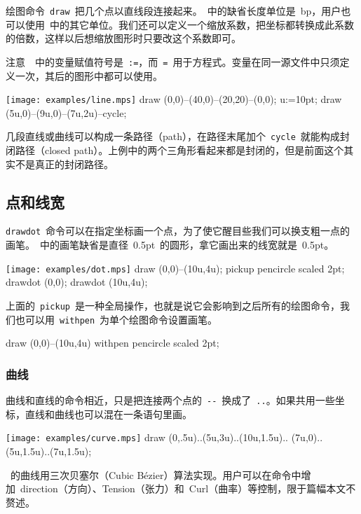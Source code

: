 绘图命令~\verb|draw|~把几个点以直线段连接起来。\MP~中的缺省长度单位是~bp，用户也可以使用~中的其它单位。我们还可以定义一个缩放系数，把坐标都转换成此系数的倍数，这样以后想缩放图形时只要改这个系数即可。

注意~\MP~中的变量赋值符号是~\verb|:=|，而~\verb|=|~用于方程式。变量在同一源文件中只须定义一次，其后的图形中都可以使用。

\begin{fdemo}{\texttt{[image: examples/line.mps]}}
draw (0,0)--(40,0)--(20,20)--(0,0);
u:=10pt; %
draw (5u,0)--(9u,0)--(7u,2u)--cycle;
\end{fdemo}

几段直线或曲线可以构成一条路径（path），在路径末尾加个~\verb|cycle|~就能构成封闭路径（closed path）。上例中的两个三角形看起来都是封闭的，但是前面这个其实不是真正的封闭路径。

\subsection{点和线宽}
\verb|drawdot|~命令可以在指定坐标画一个点，为了使它醒目些我们可以换支粗一点的画笔。\MP~中的画笔缺省是直径~0.5pt~的圆形，拿它画出来的线宽就是~0.5pt。

\begin{fdemo}{\texttt{[image: examples/dot.mps]}}
draw (0,0)--(10u,4u);
pickup pencircle scaled 2pt;
drawdot (0,0);
drawdot (10u,4u);
\end{fdemo}

上面的~\verb|pickup|~是一种全局操作，也就是说它会影响到之后所有的绘图命令，我们也可以用~\verb|withpen|~为单个绘图命令设置画笔。

\begin{code}
draw (0,0)--(10u,4u) withpen pencircle scaled 2pt;
\end{code}

\subsubsection{曲线}
曲线和直线的命令相近，只是把连接两个点的~\verb|--|~换成了~\verb|..|。如果共用一些坐标，直线和曲线也可以混在一条语句里画。

\begin{fdemo}{\texttt{[image: examples/curve.mps]}}
draw (0,.5u)..(5u,3u)..(10u,1.5u)..
    (7u,0)..(5u,1.5u)..(7u,1.5u);
\end{fdemo}

\MP~的曲线用三次贝塞尔（Cubic B\'ezier）算法实现。用户可以在命令中增加~direction（方向）、Tension（张力）和~Curl（曲率）等控制，限于篇幅本文不赘述。

